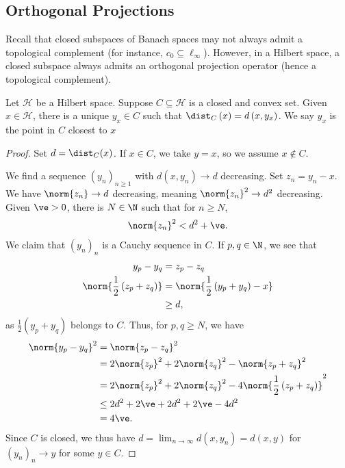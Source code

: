 \documentclass[10pt]{mypackage}
\begin{document}
\subsection{Orthogonal Projections}%
Recall that closed subspaces of Banach spaces may not always admit a topological complement (for instance, $c_0\subseteq \ell_{\infty}$). However, in a Hilbert space, a closed subspace always admits an orthogonal projection operator (hence a topological complement).
\begin{theorem}
  Let $\mathcal{H}$ be a Hilbert space. Suppose $C\subseteq \mathcal{H}$ is a closed and convex set. Given $x\in \mathcal{H}$, there is a unique $y_x\in C$ such that $\dist_{C}\left(x\right) = d\left(x,y_x\right)$. We say $y_x$ is the point in $C$ closest to $x$
\end{theorem}
\begin{proof}
  Set $d = \dist_{C}(x)$. If $x\in C$, we take $y=x$, so we assume $x\notin C$.\newline

  We find a sequence $\left(y_n\right)_{n\geq 1}$ with $d\left(x,y_n\right)\rightarrow d$ decreasing. Set $z_n = y_n - x$. We have $\norm{z_n}\rightarrow d$ decreasing, meaning $\norm{z_n}^2 \rightarrow d^2$ decreasing. Given $\ve > 0$, there is $N\in \N$ such that for $n\geq N$,
  \begin{align*}
    \norm{z_n}^2 < d^2 + \ve.
  \end{align*}
  We claim that $\left(y_n\right)_{n}$ is a Cauchy sequence in $C$. If $p,q\in \N$, we see that
  \begin{align*}
    y_p - y_q &= z_p - z_q\\
    \norm{\frac{1}{2}\left(z_p + z_q\right)} &= \norm{\frac{1}{2}\left(y_p + y_q\right) - x}\\
                                             &\geq d,
  \end{align*}
  as $\frac{1}{2}\left(y_p + y_q\right)$ belongs to $C$. Thus, for $p,q \geq N$, we have
  \begin{align*}
    \norm{y_p - y_q}^2 &= \norm{z_p - z_q}^2\\
                       &= 2\norm{z_p}^2 + 2\norm{z_q}^2 - \norm{z_p + z_q}^2\\
                       &= 2\norm{z_p}^2 + 2\norm{z_q}^2 - 4\norm{\frac{1}{2}\left(z_p + z_q\right)}^2\\
                       &\leq 2d^2 + 2\ve + 2d^2 + 2\ve - 4d^2\\
                       &= 4\ve.
  \end{align*}
  Since $C$ is closed, we thus have $d = \lim_{n\rightarrow\infty}d\left(x,y_n\right) = d\left(x,y\right)$ for $\left(y_n\right)_n \rightarrow y$ for some $y\in C$.\newline


\end{proof}
\end{document}
